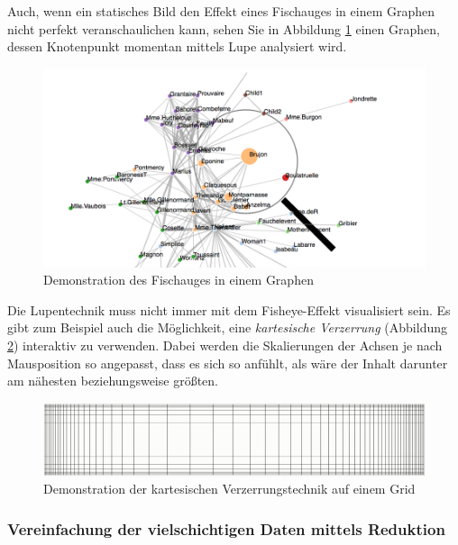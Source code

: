 Auch, wenn ein statisches Bild den Effekt eines Fischauges in einem Graphen nicht perfekt veranschaulichen kann, sehen Sie in Abbildung \ref{fig:FisheyeGraph} einen Graphen, dessen Knotenpunkt  momentan mittels Lupe analysiert wird.

\begin{figure}
    \centering
    \includegraphics[width=1\textwidth]{content/img/Research/Visualisation/fisheye_graph.png}
    \caption{Demonstration des Fischauges in einem Graphen \cite{githubgistFisheye}}
    \label{fig:FisheyeGraph}
\end{figure}
\FloatBarrier

Die Lupentechnik muss nicht immer mit dem Fisheye-Effekt visualisiert sein. Es gibt zum Beispiel auch die Möglichkeit, eine \emph{kartesische Verzerrung} (Abbildung \ref{fig:LupentechnikGridCartesian}) interaktiv zu verwenden. Dabei werden die Skalierungen der Achsen je nach Mausposition so angepasst, dass es sich so anfühlt, als wäre der Inhalt darunter am nähesten beziehungsweise größten. \cite{bostock2012fisheye}

\begin{figure}
    \centering
    \includegraphics[width=1\textwidth]{content/img/Research/Visualisation/distortion_cartesian.png}
    \caption{Demonstration der kartesischen Verzerrungstechnik auf einem Grid \cite{bostock2012fisheye}}
    \label{fig:LupentechnikGridCartesian}
\end{figure}
\FloatBarrier

\subsubsection{Vereinfachung der vielschichtigen Daten mittels Reduktion}

